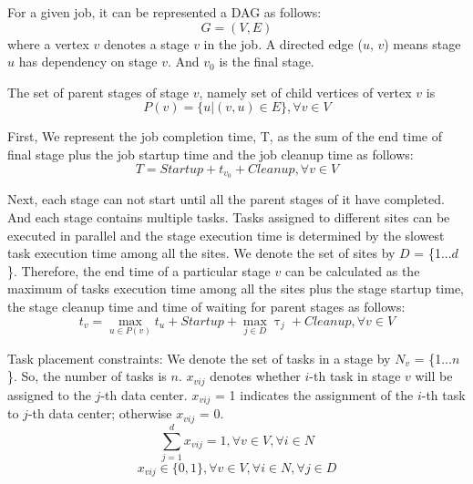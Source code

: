 \documentclass[base.tex]{subfiles}
\begin{document}
For a given job, it can be represented a DAG as follows:
\begin{equation}
\label{eq:DAG}
	G = (V, E)
\end{equation}
where a vertex $v$ denotes a stage $v$ in the job. A directed edge ($u$, $v$) means stage $u$ has dependency on stage $v$. And $v_{0}$ is the final stage.

The set of parent stages of stage $v$, namely set of child vertices of vertex $v$ is 
\begin{equation}
\label{eq:set of parents}
	P(v) = \{u|(v, u)\in E\}, \forall v \in V
\end{equation}

First, We represent the job completion time, T, as the sum of the end time of final stage plus the job startup time and the job cleanup time as follows: 
\begin{equation}
\label{eq:job completion time}
	T = Startup + t_{v_{0}} + Cleanup, \forall v \in V
\end{equation}

Next, each stage can not start until all the parent stages of it have completed. And each stage contains multiple tasks. Tasks assigned to different sites can be executed in parallel and the stage execution time is determined by the slowest task execution time among all the sites. We denote the set of sites by $D$ = \{1...$d$\}. Therefore, the end time of a particular stage $v$ can be calculated as the maximum of tasks execution time among all the sites plus the stage startup time, the stage cleanup time and time of waiting for parent stages as follows:
\begin{equation}
\label{eq:stage end time}
	t_{v} = \max_{u \in P(v)}t_{u} + Startup + \max_{j \in D}\uptau_{j} + Cleanup, \forall v \in V
\end{equation}

Task placement constraints: We denote the set of tasks in a stage by $ N_{v} $ = \{1...$n$\}. So, the number of tasks is $n$. $x_{vij}$ denotes whether $i$-th task in stage $v$ will be assigned to the $j$-th data center. $x_{vij}$ = 1 indicates the assignment of the $i$-th task to $j$-th data center; otherwise $x_{vij}$ = 0.
\begin{equation}
\label{eq:Percentages Sum}
	\sum_{j=1}^{d}x_{vij} = 1, \forall v \in V, \forall i \in N
\end{equation}
\begin{equation}
\label{eq:binary}
	x_{vij} \in \{0, 1\}, \forall v \in V, \forall i \in N, \forall j \in D
\end{equation}
\end{document}
